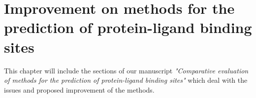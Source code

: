 \chapter{Improvement on methods for the prediction of protein-ligand binding sites}

This chapter will include the sections of our manuscript \textit{"Comparative evaluation of methods for the prediction of protein-ligand binding sites"} which deal with the issues and proposed improvement of the methods.